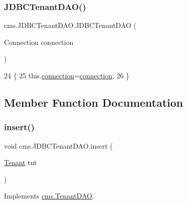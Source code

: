 \subsubsection{\texorpdfstring{J\+D\+B\+C\+Tenant\+D\+A\+O()}{JDBCTenantDAO()}}
{\footnotesize\ttfamily cms.\+J\+D\+B\+C\+Tenant\+D\+A\+O.\+J\+D\+B\+C\+Tenant\+D\+AO (\begin{DoxyParamCaption}\item[{Connection}]{connection }\end{DoxyParamCaption})\hspace{0.3cm}{\ttfamily [inline]}}


\begin{DoxyCode}
24                                                \{
25          this.\mbox{\hyperlink{classcms_1_1_j_d_b_c_tenant_d_a_o_a08dc3f2801dc5348c6473632b342d62a}{connection}}=\mbox{\hyperlink{classcms_1_1_j_d_b_c_tenant_d_a_o_a08dc3f2801dc5348c6473632b342d62a}{connection}};
26     \}
\end{DoxyCode}


\subsection{Member Function Documentation}
\mbox{\label{classcms_1_1_j_d_b_c_tenant_d_a_o_a76c9d02d8ea133d2f38744f15726ace9}} 
\subsubsection{\texorpdfstring{insert()}{insert()}}
{\footnotesize\ttfamily void cms.\+J\+D\+B\+C\+Tenant\+D\+A\+O.\+insert (\begin{DoxyParamCaption}\item[{\mbox{\hyperlink{classcms_1_1_tenant}{Tenant}}}]{tnt }\end{DoxyParamCaption})\hspace{0.3cm}{\ttfamily [inline]}}



Implements \mbox{\hyperlink{interfacecms_1_1_tenant_d_a_o_a4c4f436ddf88bf487f1ab639ca383bb6}{cms.\+Tenant\+D\+AO}}.


